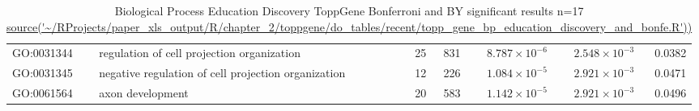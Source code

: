 \begin{table}[ht]
\begin{adjustbox}{width=\textwidth}
\begin{tabular}{llrrrrr}
  GO:0031344 & regulation of cell projection organization & 25 & 831 & $8.787 \times 10^{-6}$ & $2.548 \times 10^{-3}$ & 0.0382 \\ 
  GO:0031345 & negative regulation of cell projection organization & 12 & 226 & $1.084 \times 10^{-5}$ & $2.921 \times 10^{-3}$ & 0.0471 \\ 
  GO:0061564 & axon development & 20 & 583 & $1.142 \times 10^{-5}$ & $2.921 \times 10^{-3}$ & 0.0496 \\ 
   \hline
\end{tabular}
\end{adjustbox}
\caption{Biological Process Education Discovery ToppGene Bonferroni and BY significant results n=17 \url{source('~/RProjects/paper_xls_output/R/chapter_2/toppgene/do_tables/recent/topp_gene_bp_education_discovery_and_bonfe.R'))}}
\label{tab:Biological Process Education Discovery ToppGene top10 results BY}
\end{table}
         
            
 
